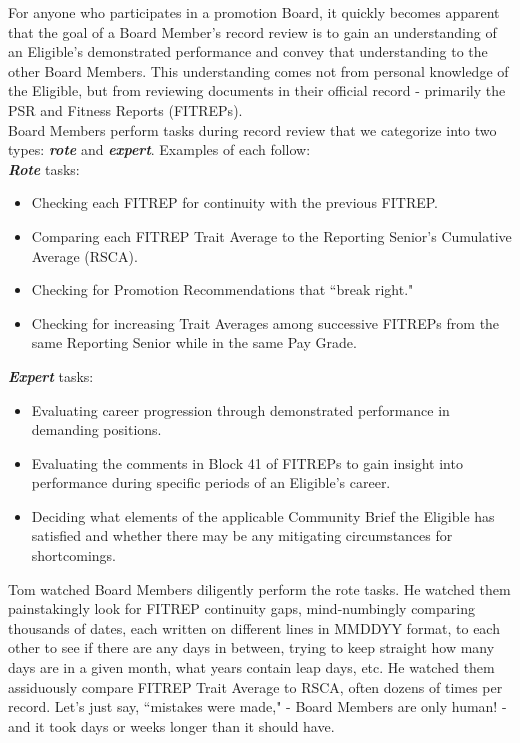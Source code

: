 \documentclass[UTF8]{article}
\begin{document}
For anyone who participates in a promotion Board, it quickly becomes apparent
that the goal of a Board Member's record review is to gain an understanding of
an Eligible's demonstrated performance and convey that understanding to the
other Board Members. This understanding comes not from personal knowledge of the
Eligible, but from reviewing documents in their official record - primarily the
PSR and Fitness Reports (FITREPs).\\


Board Members perform tasks during record review that we categorize into two
types:
\textit{\textbf{rote}} and \textit{\textbf{expert}}. Examples of each follow:\\

\textit{\textbf{Rote}} tasks: 
\begin{itemize}
  \item Checking each FITREP for continuity with the previous FITREP.
  \item Comparing each FITREP Trait Average to the Reporting Senior's Cumulative
  Average (RSCA).
  \item Checking for Promotion Recommendations that ``break right."
  \item Checking for increasing Trait Averages among successive FITREPs from the
  same Reporting Senior while in the same Pay Grade. 
\end{itemize}

\textit{\textbf{Expert}} tasks: 
\begin{itemize}
  \item Evaluating career progression through demonstrated performance in
  demanding positions.
  \item Evaluating the comments in Block 41 of FITREPs to gain insight into 
  performance during specific periods of an Eligible's career.
  \item Deciding what elements of the applicable Community Brief the Eligible
  has satisfied and whether there may be any mitigating circumstances for
  shortcomings.
\end{itemize}

Tom watched Board Members diligently perform the rote tasks. He watched them 
painstakingly look for FITREP continuity gaps, mind-numbingly comparing thousands 
of dates, each written on different lines in MMDDYY format, to each other to see 
if there are any days in between, trying to keep straight how many days are in a
given month, what years contain leap days, etc. He watched them assiduously compare 
FITREP Trait Average to RSCA, often dozens of times per record. Let's just say, 
``mistakes were made," - Board Members are only human! - and it took days or weeks
longer than it should have. \\
\end{document}
